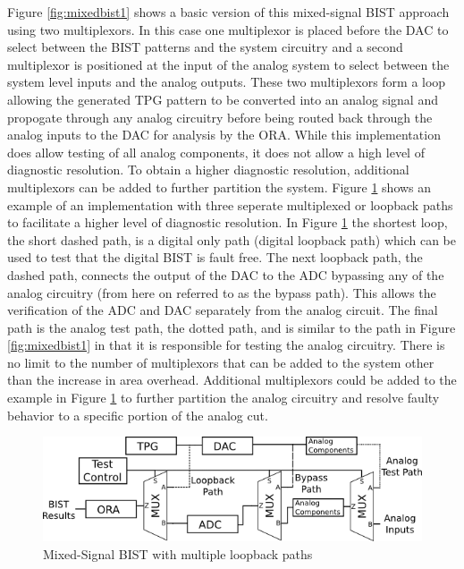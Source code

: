 \documentclass[12pt]{report}
\begin{document}
Figure \ref{fig:mixedbist1} shows a basic version of this mixed-signal BIST approach using two multiplexors.  In this case one multiplexor is placed before the DAC to select between the BIST patterns and the system circuitry and a second multiplexor is positioned at the input of the analog system to select between the system level inputs and the analog outputs.  These two multiplexors form a loop allowing the generated TPG pattern to be converted into an analog signal and propogate through any analog circuitry before being routed back through the analog inputs to the DAC for analysis by the ORA.  While this implementation does allow testing of all analog components, it does not allow a high level of diagnostic resolution\cite{syschip}.  To obtain a higher diagnostic resolution, additional multiplexors can be added to further partition the system. Figure \ref{fig:mixedbist_paths} shows an example of an implementation with three seperate multiplexed or loopback paths to facilitate a higher level of diagnostic resolution.  In Figure \ref{fig:mixedbist_paths} the shortest loop, the short dashed path, is a digital only path (digital loopback path) which can be used to test that the digital BIST is fault free.  The next loopback path, the dashed path, connects the output of the DAC to the ADC bypassing any of the analog circuitry (from here on referred to as the bypass path).  This allows the verification of the ADC and DAC separately from the analog circuit.  The final path is the analog test path, the dotted path, and is similar to the path in Figure \ref{fig:mixedbist1} in that it is responsible for testing the analog circuitry.  There is no limit to the number of multiplexors that can be added to the system other than the increase in area overhead\cite{syschip}.  Additional multiplexors could be added to the example in Figure \ref{fig:mixedbist_paths} to further partition the analog circuitry and resolve faulty behavior to a specific portion of the analog cut.
\begin{figure}
	\begin{center}
		\includegraphics[scale=1]{images/mixedbist-paths}
	\end{center}
	\caption{Mixed-Signal BIST with multiple loopback paths}
	\label{fig:mixedbist_paths}
\end{figure}
\end{document}

